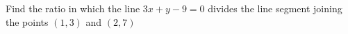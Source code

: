 
%
%
%
%
% 

\question[5]   Find the ratio in which the line $3x+y-9=0$ divides the line segment
joining the points $(1,3)$ and $(2,7)$

\ifprintanswers
\fi 


